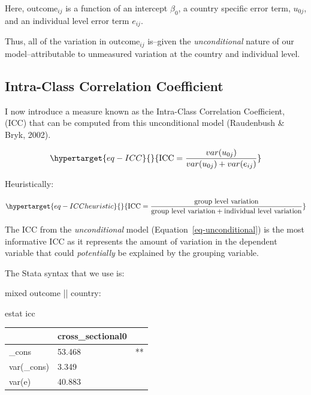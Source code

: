 \documentclass[
  letterpaper,
  DIV=11,
  numbers=noendperiod]{scrreprt}
\newenvironment{Shaded}{\begin{snugshade}}{\end{snugshade}}
\newcommand{\KeywordTok}[1]{\textcolor[rgb]{0.00,0.23,0.31}{#1}}
\newcommand{\NormalTok}[1]{\textcolor[rgb]{0.00,0.23,0.31}{#1}}
\begin{document}
Here, \(\text{outcome}_{ij}\) is a function of an intercept \(\beta_0\),
a country specific error term, \(u_{0j}\), and an individual level error
term \(e_{ij}\).

Thus, all of the variation in \(\text{outcome}_{ij}\) is--given the
\emph{unconditional} nature of our model--attributable to unmeasured
variation at the country and individual level.

\hypertarget{sec-ICC}{%
\subsection{Intra-Class Correlation Coefficient}\label{sec-ICC}}

I now introduce a measure known as the Intra-Class Correlation
Coefficient, (ICC) that can be computed from this unconditional model
(Raudenbush \& Bryk, 2002).

\begin{equation}\protect\hypertarget{eq-ICC}{}{\text{ICC} = \frac{var(u_{0j})}{var(u_{0j}) + var(e_{ij})}}\label{eq-ICC}\end{equation}

Heuristically:

\begin{equation}\protect\hypertarget{eq-ICCheuristic}{}{\text{ICC} = \frac{\text{group level variation}}{\text{group level variation} + \text{individual level variation}}}\label{eq-ICCheuristic}\end{equation}

The ICC from the \emph{unconditional} model
(Equation~\ref{eq-unconditional}) is the most informative ICC as it
represents the amount of variation in the dependent variable that could
\emph{potentially} be explained by the grouping variable.

The Stata syntax that we use is:

\begin{Shaded}
\begin{Highlighting}[]

\NormalTok{mixed outcome || country: }

\KeywordTok{estat}\NormalTok{ icc}
\end{Highlighting}
\end{Shaded}

\begin{longtable}[]{@{}lll@{}}
\toprule\noalign{}
& cross\_sectional0 & \\
\midrule\noalign{}
\endhead
\bottomrule\noalign{}
\endlastfoot
\_cons & 53.468 & ** \\
var(\_cons) & 3.349 & \\
var(e) & 40.883 & \\
\end{longtable}
\end{document}
